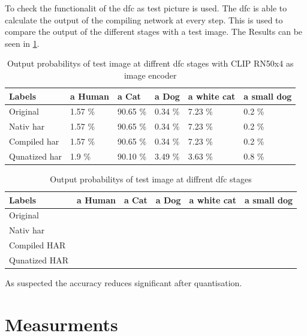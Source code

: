 To check the functionalit of the \acrshort{dfc} as test picture is used.
The \acrshort{dfc} is able to calculate the output of the compiling network at every step.
This is used to compare the output of the different stages with a test image.
The Results can be seen in \cref{tab:methods:clipcompare}.

\begin{table}[]
    \centering
    \begin{tabular}{llllll}
    \hline
    Labels        & a Human & a Cat   & a Dog  & a white cat & a small dog \\ \hline
    Original      & 1.57 \%  & 90.65 \% & 0.34 \% & 7.23 \%      & 0.2 \%       \\
    Nativ \acrshort{har}        & 1.57 \%  & 90.65 \% & 0.34 \% & 7.23 \%      & 0.2 \%       \\
    Compiled \acrshort{har}     & 1.57 \%  & 90.65 \% & 0.34 \% & 7.23 \%      & 0.2 \%       \\
    Qunatized \acrshort{har}    & 1.9 \%   & 90.10 \% & 3.49 \% & 3.63 \%      & 0.8 \%       \\ \hline
    \end{tabular}
    \caption{Output probabilitys of test image at diffrent \acrshort{dfc} stages with CLIP RN50x4 as image encoder}
    \label{tab:methods:clipcompare}
\end{table}

\begin{table}
    \centering
    \begin{tabular}{llllll}
    \hline
    Labels        & a Human & a Cat & a Dog & a white cat & a small dog \\ \hline
    Original      &         &       &       &             &             \\
    Nativ \acrshort{har}     &         &       &       &             &             \\
    Compiled HAR  &         &       &       &             &             \\
    Qunatized HAR &         &       &       &             &                   
    \end{tabular}
    \caption{Output probabilitys of test image at diffrent \acrshort{dfc} stages
    \label{tab:methods:tinyclipcompare}}
\end{table}

As suspected the accuracy reduces significant after quantisation.


\section{Measurments}

